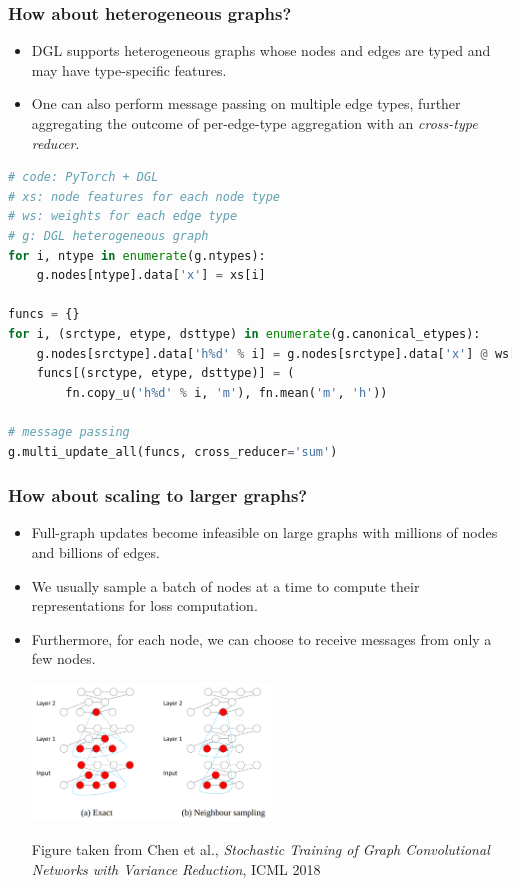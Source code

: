 \documentclass[10pt,aspectratio=169]{beamer}
\begin{document}
	\begin{frame}[fragile]
		\frametitle{How about heterogeneous graphs?}
		\begin{itemize}
			\item DGL supports heterogeneous graphs whose nodes and edges are typed and may have type-specific features.
			\item One can also perform message passing on multiple edge types, further aggregating the outcome of per-edge-type aggregation with an \emph{cross-type reducer}.
		\end{itemize}
		\begin{center}
			\centering
			\begin{minipage}{0.7\textwidth}
\begin{lstlisting}[language=Python]
# code: PyTorch + DGL
# xs: node features for each node type
# ws: weights for each edge type
# g: DGL heterogeneous graph
for i, ntype in enumerate(g.ntypes):
    g.nodes[ntype].data['x'] = xs[i]

funcs = {}
for i, (srctype, etype, dsttype) in enumerate(g.canonical_etypes):
    g.nodes[srctype].data['h%d' % i] = g.nodes[srctype].data['x'] @ ws[etype]
    funcs[(srctype, etype, dsttype)] = (
        fn.copy_u('h%d' % i, 'm'), fn.mean('m', 'h'))

# message passing
g.multi_update_all(funcs, cross_reducer='sum')
\end{lstlisting}
			\end{minipage}
		\end{center}
	\end{frame}

	\begin{frame}
		\frametitle{How about scaling to larger graphs?}
		\begin{itemize}
			\item Full-graph updates become infeasible on large graphs with millions of nodes and billions of edges.
			\item We usually sample a batch of nodes at a time to compute their representations for loss computation.
			\item Furthermore, for each node, we can choose to receive messages from only a few nodes.
			\begin{center}
				\centering
				\includegraphics[width=0.5\textwidth]{nodeflow.png}
				
				\small Figure taken from Chen et al., \emph{Stochastic Training of Graph Convolutional Networks with Variance Reduction}, ICML 2018
			\end{center}
		\end{itemize}
	\end{frame}
\end{document}
